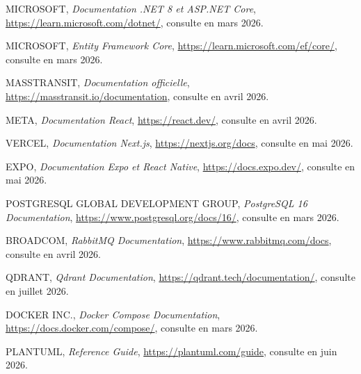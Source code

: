 \begin{enumerate}[label={[\arabic*]},leftmargin=*,itemsep=4pt,start=10]

\item MICROSOFT, \textit{Documentation .NET 8 et ASP.NET Core},
  \url{https://learn.microsoft.com/dotnet/}, consulte en mars 2026.

\item MICROSOFT, \textit{Entity Framework Core},
  \url{https://learn.microsoft.com/ef/core/}, consulte en mars 2026.

\item MASSTRANSIT, \textit{Documentation officielle},
  \url{https://masstransit.io/documentation}, consulte en avril 2026.

\item META, \textit{Documentation React},
  \url{https://react.dev/}, consulte en avril 2026.

\item VERCEL, \textit{Documentation Next.js},
  \url{https://nextjs.org/docs}, consulte en mai 2026.

\item EXPO, \textit{Documentation Expo et React Native},
  \url{https://docs.expo.dev/}, consulte en mai 2026.

\item POSTGRESQL GLOBAL DEVELOPMENT GROUP, \textit{PostgreSQL 16
  Documentation}, \url{https://www.postgresql.org/docs/16/}, consulte en
  mars 2026.

\item BROADCOM, \textit{RabbitMQ Documentation},
  \url{https://www.rabbitmq.com/docs}, consulte en avril 2026.

\item QDRANT, \textit{Qdrant Documentation},
  \url{https://qdrant.tech/documentation/}, consulte en juillet 2026.

\item DOCKER INC., \textit{Docker Compose Documentation},
  \url{https://docs.docker.com/compose/}, consulte en mars 2026.

\item PLANTUML, \textit{Reference Guide},
  \url{https://plantuml.com/guide}, consulte en juin 2026.

\end{enumerate}
